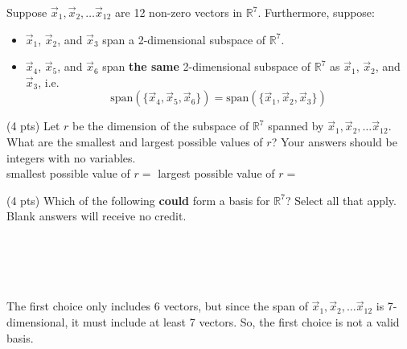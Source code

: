 \documentclass[11pt]{article}
\begin{document}
\newpage

\begin{prob}
Suppose $\vec x_1, \vec x_2, \ldots \vec x_{12}$ are 12 non-zero vectors in $\mathbb{R}^{7}$. Furthermore, suppose:

\begin{itemize}
  \item $\vec x_1$, $\vec x_2$, and $\vec x_3$ span a 2-dimensional subspace of $\mathbb{R}^{7}$.
  \item $\vec x_4$, $\vec x_5$, and $\vec x_6$ span \textbf{the same} 2-dimensional subspace of $\mathbb{R}^{7}$ as $\vec x_1$, $\vec x_2$, and $\vec x_3$, i.e. $$\text{span}(\{\vec x_4, \vec x_5, \vec x_6\}) = \text{span}(\{\vec x_1, \vec x_2, \vec x_3\})$$
\end{itemize}

\begin{subprob}(4 pts) Let $r$ be the dimension of the subspace of $\mathbb{R}^{7}$ spanned by $\vec x_1, \vec x_2, \ldots \vec x_{12}$. What are the smallest and largest possible values of $r$? Your answers should be integers with no variables. \\

smallest possible value of $r = $  \hspace{1cm}
largest possible value of $r = $ 

\end{subprob}

\begin{subprob}(4 pts) Which of the following \textbf{could} form a basis for $\mathbb{R}^{7}$? Select all that apply. Blank answers will receive no credit. \\

 \\
 \\
 \\
 \\

\begin{solution}
The first choice only includes 6 vectors, but since the span of $\vec x_1, \vec x_2, \ldots \vec x_{12}$ is 7-dimensional, it must include at least 7 vectors. So, the first choice is not a valid basis.


\end{solution}
\end{subprob}
\end{prob}
\end{document}
